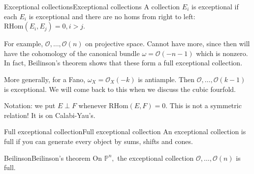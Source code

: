 \begin{definition}{Exceptional collections}{Exceptional collections}
    A collection $E_i$ is exceptional if each $E_i$ is exceptional and there are no homs from right to left: $\mathrm{RHom}(E_{i}, E_{j})=0, i>j$.
\end{definition}


For example, $\mathcal{O},\dots,\mathcal{O}(n)$ on projective space. Cannot have more, since then will have the cohomology of the canonical bundle $\omega=\mathcal{O}(-n-1)$ which is nonzero. In fact, Beilinson's theorem shows that these form a full exceptional collection. 

More generally, for a Fano, $\omega_{X}=\mathcal{O}_{X}(-k)$ is antiample. Then $\mathcal{O}, \dots, \mathcal{O}(k-1)$ is exceptional. We will come back to this when we discuss the cubic fourfold.


Notation: we put $E \perp F$ whenever $\mathrm{RHom}(E,F)=0$. This is not a symmetric relation! It is on Calabi-Yau's. 

\begin{definition}{Full exceptional collection}{Full exceptional collection}
    An exceptional collection is full if you can generate every object by sums, shifts and cones.

\end{definition}

\begin{theorem}{Beilinson}{Beilinson's theorem}
    On $\mathbb{P}^n,$ the exceptional collection $\mathcal{O},\dots,\mathcal{O}(n)$ is full.
\end{theorem} 

